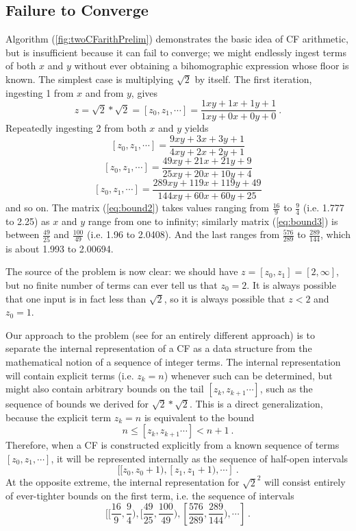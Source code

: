 \documentclass[11pt, oneside]{amsart}   	%
\newcommand{\bihom}[8]{{\frac{#1 xy + #2 x + #3 y + #4}{#5 xy + #6 x + #7 y + #8}}}
\begin{document}
\subsection{Failure to Converge}
Algorithm (\ref{fig:twoCFarithPrelim}) demonstrates the basic idea of CF arithmetic, but is insufficient because it can fail to converge;
we might endlessly ingest terms of both $x$ and $y$ without ever obtaining a bihomographic expression whose floor is known. The
simplest case is multiplying $\sqrt{2}$ by itself. The first iteration, ingesting 1 from $x$ and from $y$, gives
\begin{equation*}
z = \sqrt{2}*\sqrt{2} = [z_0,z_1, \cdots] = \bihom{1}{1}{1}{1}{1}{0}{0}{0} \ .
\end{equation*}
Repeatedly ingesting 2 from both $x$ and $y$ yields
\begin{equation}\label{eq:bound2}
[z_0,z_1, \cdots]  =  \bihom{9}{3}{3}{1}{4}{2}{2}{1}
\end{equation}
\begin{equation}\label{eq:bound3}
[z_0,z_1, \cdots]  =  \bihom{49}{21}{21}{9}{25}{20}{10}{4}
\end{equation}
\begin{equation}\label{eq:bound4}
[z_0,z_1, \cdots]  =  \bihom{289}{119}{119}{49}{144}{60}{60}{25}
\end{equation}
and so on. The matrix (\ref{eq:bound2}) takes values ranging from $\frac{16}{9}$ to $\frac{9}{4}$ (i.e. 1.777 to 2.25)
as $x$ and $y$ range from one to infinity;
similarly matrix (\ref{eq:bound3}) is between $\frac{49}{25}$ and $\frac{100}{49}$ (i.e. 1.96 to 2.0408).
And the last ranges from $\frac{576}{289}$ to $\frac{289}{144}$, which is about 1.993 to 2.00694.

The source of the problem is now clear: we should have $z=[z_0,z_1]=[2,\infty]$, but no finite number of terms can ever tell us that
$z_0=2$. It is always possible that one input is in fact less than $\sqrt{2}$, so it is always possible that $z<2$ and $z_0=1$.

Our approach to the problem (see \cite{Lester01} for an entirely different approach)
is to separate the internal representation of a CF as a data structure from the mathematical notion of a  sequence of integer terms. The
internal representation will contain explicit terms (i.e. $z_k=n$) whenever such can be determined, but might also contain arbitrary
bounds on the tail $[z_k, z_{k+1}\cdots]$, such as the  sequence of bounds we derived for $\sqrt{2}*\sqrt{2}$. This is a direct
generalization, because the explicit term  $z_k=n$ is equivalent to the bound 
\[
n \leq [z_k, z_{k+1}\cdots] < n+1 \ .
\]
Therefore, when a CF is constructed explicitly from a known sequence of terms $[z_0, z_1, \cdots]$,
it will be represented internally as the sequence of half-open intervals
\[
[[z_0, z_0+1),  [z_1, z_1+1), \cdots]\ .
\] 
At the opposite extreme, the internal representation for $\sqrt{2}^2$ will consist entirely of ever-tighter bounds on the first term, i.e. the sequence of intervals
\[
[[\frac{16}{9},\frac{9}{4}), [\frac{49}{25},\frac{100}{49}), [\frac{576}{289},\frac{289}{144}), \cdots]\ .
\] 
\end{document}
